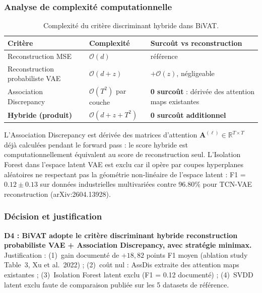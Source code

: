 \documentclass[12pt,a4paper]{article}
\begin{document}
\subsubsection{Analyse de complexité computationnelle}

\begin{table}[ht]
\centering
\caption{Complexité du critère discriminant hybride dans BiVAT.}
\label{tab:complexite-d4}
\small
\begin{tabular}{p{4.5cm}p{3cm}p{5cm}}
\toprule
\textbf{Critère} & \textbf{Complexité} &
\textbf{Surcoût vs reconstruction} \\
\midrule
Reconstruction MSE & $\mathcal{O}(d)$ & référence \\
Reconstruction probabiliste VAE & $\mathcal{O}(d + z)$ & $+\mathcal{O}(z)$, négligeable \\
Association Discrepancy & $\mathcal{O}(T^2)$ par couche &
\textbf{0 surcoût} : dérivée des attention maps existantes \\
\textbf{Hybride (produit)} & $\mathcal{O}(d + z + T^2)$ &
\textbf{0 surcoût additionnel} \\
\bottomrule
\end{tabular}
\end{table}

L'Association Discrepancy est dérivée des matrices d'attention
$\mathbf{A}^{(\ell)} \in \mathbb{R}^{T \times T}$ déjà calculées pendant le
forward pass : le score hybride est computationnellement équivalent au score
de reconstruction seul. L'Isolation Forest dans l'espace latent VAE est exclu
car il opère par coupes hyperplanes aléatoires ne respectant pas la géométrie
non-linéaire de l'espace latent : F1 = $0.12 \pm 0.13$ sur données industrielles
multivariées contre 96.80\% pour TCN-VAE reconstruction (arXiv:2604.13928).

\subsubsection{Décision et justification}

\textbf{D4 : BiVAT adopte le critère discriminant hybride reconstruction
probabiliste VAE + Association Discrepancy, avec stratégie minimax.} Justification :
(1)~gain documenté de $+18{,}82$ points F1 moyen (ablation study Table~3,
Xu et al.\ 2022) ; (2)~coût nul : AssDis extraite des attention maps existantes ;
(3)~Isolation Forest latent exclu (F1 = 0.12 documenté) ; (4)~SVDD latent exclu
faute de comparaison publiée sur les 5 datasets de référence.
\end{document}
